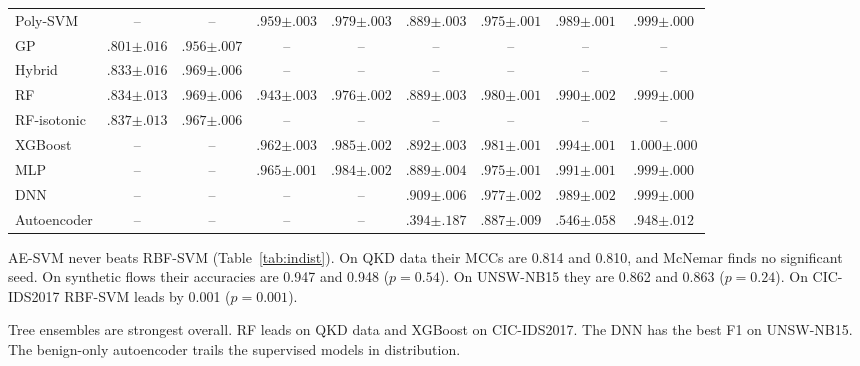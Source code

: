 \documentclass[journal]{IEEEtran}
\begin{document}
\begin{table}[t]
\begin{tabular}{lcccccccc}
    Poly-SVM & -- & -- & $.959{\scriptstyle\pm.003}$ & $.979{\scriptstyle\pm.003}$ & $.889{\scriptstyle\pm.003}$ & $.975{\scriptstyle\pm.001}$ & $.989{\scriptstyle\pm.001}$ & $.999{\scriptstyle\pm.000}$ \\
    GP & $.801{\scriptstyle\pm.016}$ & $.956{\scriptstyle\pm.007}$ & -- & -- & -- & -- & -- & -- \\
    Hybrid & $.833{\scriptstyle\pm.016}$ & $.969{\scriptstyle\pm.006}$ & -- & -- & -- & -- & -- & -- \\
    RF & $.834{\scriptstyle\pm.013}$ & $.969{\scriptstyle\pm.006}$ & $.943{\scriptstyle\pm.003}$ & $.976{\scriptstyle\pm.002}$ & $.889{\scriptstyle\pm.003}$ & $.980{\scriptstyle\pm.001}$ & $.990{\scriptstyle\pm.002}$ & $\mathbf{.999{\scriptstyle\pm.000}}$ \\
    RF-isotonic & $\mathbf{.837{\scriptstyle\pm.013}}$ & $.967{\scriptstyle\pm.006}$ & -- & -- & -- & -- & -- & -- \\
    XGBoost & -- & -- & $.962{\scriptstyle\pm.003}$ & $\mathbf{.985{\scriptstyle\pm.002}}$ & $.892{\scriptstyle\pm.003}$ & $\mathbf{.981{\scriptstyle\pm.001}}$ & $\mathbf{.994{\scriptstyle\pm.001}}$ & $\mathbf{1.000{\scriptstyle\pm.000}}$ \\
    MLP & -- & -- & $\mathbf{.965{\scriptstyle\pm.001}}$ & $.984{\scriptstyle\pm.002}$ & $.889{\scriptstyle\pm.004}$ & $.975{\scriptstyle\pm.001}$ & $.991{\scriptstyle\pm.001}$ & $\mathbf{.999{\scriptstyle\pm.000}}$ \\
    DNN & -- & -- & -- & -- & $\mathbf{.909{\scriptstyle\pm.006}}$ & $.977{\scriptstyle\pm.002}$ & $.989{\scriptstyle\pm.002}$ & $\mathbf{.999{\scriptstyle\pm.000}}$ \\
    Autoencoder & -- & -- & -- & -- & $.394{\scriptstyle\pm.187}$ & $.887{\scriptstyle\pm.009}$ & $.546{\scriptstyle\pm.058}$ & $.948{\scriptstyle\pm.012}$ \\
    \bottomrule
  \end{tabular}
\end{table}

AE-SVM never beats RBF-SVM (Table~\ref{tab:indist}). On QKD data their MCCs are
0.814 and 0.810, and McNemar finds no significant seed. On synthetic flows their
accuracies are 0.947 and 0.948 ($p=0.54$). On UNSW-NB15 they are 0.862 and 0.863
($p=0.24$). On CIC-IDS2017 RBF-SVM leads by 0.001 ($p=0.001$).

Tree ensembles are strongest overall. RF leads on QKD data and XGBoost on
CIC-IDS2017. The DNN has the best F1 on UNSW-NB15. The benign-only autoencoder
trails the supervised models in distribution.
\end{document}
